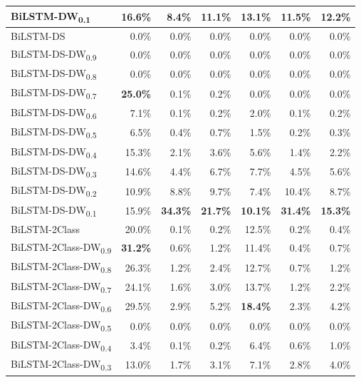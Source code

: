 \documentclass[11pt,a4paper]{article}
\begin{document}
\begin{table}
\begin{tabular}{lrrrrrr}
        BiLSTM-DW\textsubscript{0.1} & 16.6\% &  \textbf{8.4\%} & \textbf{11.1\%} & \textbf{13.1\%} & \textbf{11.5\%} & \textbf{12.2\%} \\
        \hline
        BiLSTM-DS & 0.0\% & 0.0\% & 0.0\% & 0.0\% & 0.0\% & 0.0\% \\
        BiLSTM-DS-DW\textsubscript{0.9} &  0.0\% &  0.0\% &  0.0\% &  0.0\% &  0.0\% &  0.0\% \\
        BiLSTM-DS-DW\textsubscript{0.8} &  0.0\% &  0.0\% &  0.0\% &  0.0\% &  0.0\% &  0.0\% \\
        BiLSTM-DS-DW\textsubscript{0.7} & \textbf{25.0\%} &  0.1\% &  0.2\% &  0.0\% &  0.0\% &  0.0\% \\
        BiLSTM-DS-DW\textsubscript{0.6} &  7.1\% &  0.1\% &  0.2\% &  2.0\% &  0.1\% &  0.2\% \\
        BiLSTM-DS-DW\textsubscript{0.5} &  6.5\% &  0.4\% &  0.7\% &  1.5\% &  0.2\% &  0.3\% \\
        BiLSTM-DS-DW\textsubscript{0.4} & 15.3\% &  2.1\% &  3.6\% &  5.6\% &  1.4\% &  2.2\% \\
        BiLSTM-DS-DW\textsubscript{0.3} & 14.6\% &  4.4\% &  6.7\% &  7.7\% &  4.5\% &  5.6\% \\
        BiLSTM-DS-DW\textsubscript{0.2} & 10.9\% &  8.8\% &  9.7\% &  7.4\% & 10.4\% & 8.7\% \\
        BiLSTM-DS-DW\textsubscript{0.1} & 15.9\% & \textbf{34.3\%} & \textbf{21.7\%} & \textbf{10.1\%} & \textbf{31.4\%} & \textbf{15.3\%} \\
        \hline
        BiLSTM-2Class & 20.0\% & 0.1\% & 0.2\% & 12.5\% &  0.2\% &  0.4\% \\
        BiLSTM-2Class-DW\textsubscript{0.9} & \textbf{31.2\%} &  0.6\% &  1.2\% & 11.4\% &  0.4\% &  0.7\% \\
        BiLSTM-2Class-DW\textsubscript{0.8} & 26.3\% &  1.2\% &  2.4\% & 12.7\% &  0.7\% &  1.2\% \\
        BiLSTM-2Class-DW\textsubscript{0.7} & 24.1\% &  1.6\% &  3.0\% & 13.7\% &  1.2\% &  2.2\% \\
        BiLSTM-2Class-DW\textsubscript{0.6} & 29.5\% &  2.9\% &  5.2\% & \textbf{18.4\%} &  2.3\% &  4.2\% \\
        BiLSTM-2Class-DW\textsubscript{0.5} &  0.0\% &  0.0\% &  0.0\% &  0.0\% &  0.0\% &  0.0\% \\
        BiLSTM-2Class-DW\textsubscript{0.4} &  3.4\% &  0.1\% &  0.2\% &  6.4\% &  0.6\% &  1.0\% \\
        BiLSTM-2Class-DW\textsubscript{0.3} & 13.0\% &  1.7\% &  3.1\% &  7.1\% &  2.8\% &  4.0\% \\

\end{tabular}
\end{table}
\end{document}
